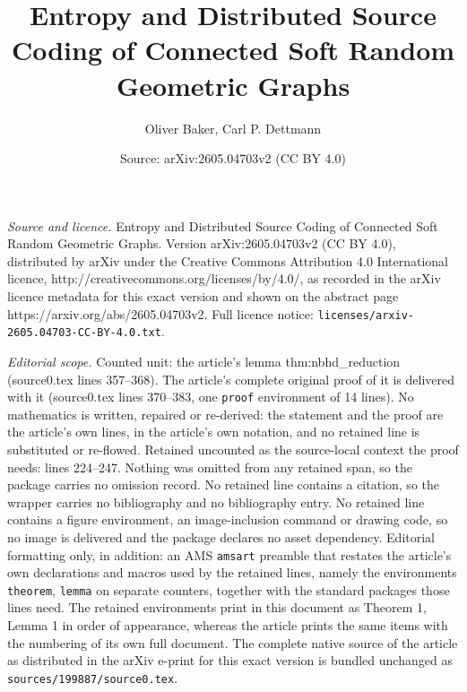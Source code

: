 \documentclass[10pt,a4paper]{amsart}
\title{Entropy and Distributed Source Coding of Connected Soft Random Geometric Graphs}
\author{Oliver Baker, Carl P. Dettmann}
\date{Source: arXiv:2605.04703v2 (CC BY 4.0)}
\begin{document}
\maketitle

\noindent\emph{Source and licence.} Entropy and Distributed Source Coding of Connected Soft Random Geometric Graphs. Version arXiv:2605.04703v2 (CC BY 4.0), distributed by arXiv under the Creative Commons Attribution 4.0 International licence, http://creativecommons.org/licenses/by/4.0/, as recorded in the arXiv licence metadata for this exact version and shown on the abstract page https://arxiv.org/abs/2605.04703v2. Full licence notice: \texttt{licenses/arxiv-2605.04703-CC-BY-4.0.txt}.\par\smallskip

\noindent\textit{Editorial scope.} Counted unit: the article's lemma thm:nbhd\_reduction (source0.tex lines 357--368). The article's complete original proof of it is delivered with it (source0.tex lines 370--383, one \texttt{proof} environment of 14 lines). No mathematics is written, repaired or re-derived: the statement and the proof are the article's own lines, in the article's own notation, and no retained line is substituted or re-flowed.  Retained uncounted as the source-local context the proof needs: lines 224--247.  Nothing was omitted from any retained span, so the package carries no omission record.  No retained line contains a citation, so the wrapper carries no bibliography and no bibliography entry.  No retained line contains a figure environment, an image-inclusion command or drawing code, so no image is delivered and the package declares no asset dependency.  Editorial formatting only, in addition: an AMS \texttt{amsart} preamble that restates the article's own declarations and macros used by the retained lines, namely the environments \texttt{theorem}, \texttt{lemma} on separate counters, together with the standard packages those lines need.  The retained environments print in this document as Theorem 1, Lemma 1 in order of appearance, whereas the article prints the same items with the numbering of its own full document.  The complete native source of the article as distributed in the arXiv e-print for this exact version is bundled unchanged as \texttt{sources/199887/source0.tex}.
\end{document}
